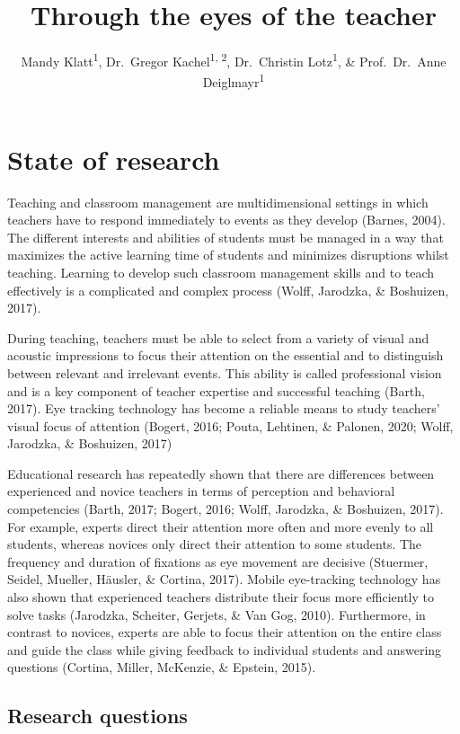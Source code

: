 \documentclass[
  english,
  man,floatsintext]{apa6}
\title{Through the eyes of the teacher}
\author{Mandy Klatt\textsuperscript{1}, Dr.~Gregor Kachel\textsuperscript{1, 2}, Dr.~Christin Lotz\textsuperscript{1}, \& Prof.~Dr.~Anne Deiglmayr\textsuperscript{1}}
\date{}
\affiliation{\vspace{0.5cm}\textsuperscript{1} University of Leipzig\\\textsuperscript{2} MPI for Evolutionary Anthropology, Leipzig}
\begin{document}
\maketitle

\hypertarget{state-of-research}{%
\section{State of research}\label{state-of-research}}

Teaching and classroom management are multidimensional settings in which teachers have to respond immediately to events as they develop (Barnes, 2004). The different interests and abilities of students must be managed in a way that maximizes the active learning time of students and minimizes disruptions whilst teaching. Learning to develop such classroom management skills and to teach effectively is a complicated and complex process (Wolff, Jarodzka, \& Boshuizen, 2017).

During teaching, teachers must be able to select from a variety of visual and acoustic impressions to focus their attention on the essential and to distinguish between relevant and irrelevant events. This ability is called professional vision and is a key component of teacher expertise and successful teaching (Barth, 2017). Eye tracking technology has become a reliable means to study teachers' visual focus of attention (Bogert, 2016; Pouta, Lehtinen, \& Palonen, 2020; Wolff, Jarodzka, \& Boshuizen, 2017)

Educational research has repeatedly shown that there are differences between experienced and novice teachers in terms of perception and behavioral competencies (Barth, 2017; Bogert, 2016; Wolff, Jarodzka, \& Boshuizen, 2017). For example, experts direct their attention more often and more evenly to all students, whereas novices only direct their attention to some students. The frequency and duration of fixations as eye movement are decisive (Stuermer, Seidel, Mueller, Häusler, \& Cortina, 2017). Mobile eye-tracking technology has also shown that experienced teachers distribute their focus more efficiently to solve tasks (Jarodzka, Scheiter, Gerjets, \& Van Gog, 2010). Furthermore, in contrast to novices, experts are able to focus their attention on the entire class and guide the class while giving feedback to individual students and answering questions (Cortina, Miller, McKenzie, \& Epstein, 2015).

\hypertarget{research-questions}{%
\subsection{Research questions}\label{research-questions}}
\end{document}
